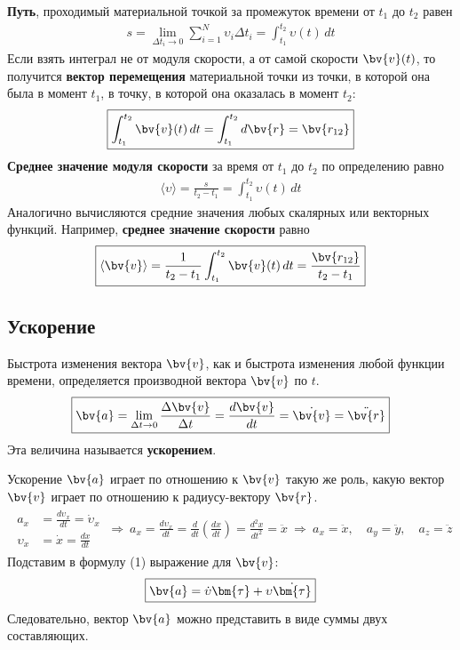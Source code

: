 \textbf{Путь}, проходимый материальной точкой за промежуток времени от $t_1$ до $t_2$ равен
\begin{gather}
    \boxed{s = \lim\limits_{\Delta t_i \to 0} \sum_{i=1}^{N} \upsilon_i \Delta t_i = \int_{t_1}^{t_2} \upsilon (t)\, dt}
\end{gather}
Если взять интеграл не от модуля скорости, а от самой скорости $\bv{v}(t)$, то получится \textbf{вектор перемещения} материальной точки из точки, в которой она была в момент $t_1$, в точку, в которой она оказалась в момент $t_2$:
\begin{gather}
    \boxed{\int_{t_1}^{t_2}\bv{v}(t)\, dt = \int_{t_1}^{t_2} d\bv{r} = \bv{r_{12}}}
\end{gather}
\textbf{Среднее значение модуля скорости} за время от $t_1$ до $t_2$ по определению равно
\begin{gather}
    \boxed{\langle\upsilon\rangle  = \frac{s}{t_2 - t_1} = \int_{t_1}^{t_2} \upsilon (t)\, dt}
\end{gather}
Аналогично вычисляются средние значения любых скалярных или векторных функций. Например, \textbf{среднее значение скорости} равно
\begin{gather}
    \boxed{\langle \bv{v} \rangle = \frac{1}{t_2 - t_1} \int_{t_1}^{t_2} \bv{v} (t)\, dt = \frac{\bv{r_{12}}}{t_2 - t_1}}
\end{gather}

\zerocounter
\subsection{Ускорение}

\begin{definition}
    Быстрота изменения вектора $\bv{v}$, как и быстрота изменения любой функции времени, определяется производной вектора $\bv{v}$ по $t$.
    \begin{gather}
        \boxed{\bv{a} = \lim_{\Delta t \to 0} \frac{\Delta \bv{v}}{\Delta t} = \frac{d\bv{v}}{dt} = \dot{\bv{v}} = \ddot{\bv{r}}}
    \end{gather}
    Эта величина называется \textbf{ускорением}.
\end{definition}
Ускорение $\bv{a}$ играет по отношению к $\bv{v}$ такую же роль, какую вектор $\bv{v}$ играет по отношению к радиусу-вектору $\bv{r}$.
\begin{gather*}
    \begin{aligned}
        a_x &= \frac{d\upsilon_x}{dt} = \dot{\upsilon}_x \\
        \upsilon_x &= \dot{x} = \frac{dx}{dt}
    \end{aligned}\ \Rightarrow\ a_x = \frac{d\upsilon_x}{dt} = \frac{d}{dt} \left(\frac{dx}{dt}\right) = \frac{d^2x}{dt^2} = \ddot{x}\ \Rightarrow\ \boxed{a_x = \ddot{x},\quad a_y = \ddot{y},\quad a_z = \ddot{z}}
\end{gather*}
Подставим в формулу (1) выражение для $\bv{v}$:
\begin{gather}
    \boxed{\bv{a} = \dot{\upsilon} \bm{\tau} + \upsilon \dot{\bm{\tau}}}
\end{gather}
Следовательно, вектор $\bv{a}$ можно представить в виде суммы двух составляющих.

